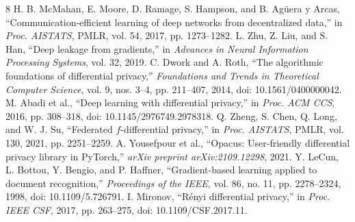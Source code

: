 \documentclass[nolineno]{ieeeaccess}
\begin{document}
\begin{thebibliography}{8}
H. B. McMahan, E. Moore, D. Ramage, S. Hampson, and B. Ag\"uera y Arcas, ``Communication-efficient learning of deep networks from decentralized data,'' in \emph{Proc. AISTATS}, PMLR, vol. 54, 2017, pp. 1273--1282.
L. Zhu, Z. Liu, and S. Han, ``Deep leakage from gradients,'' in \emph{Advances in Neural Information Processing Systems}, vol. 32, 2019.
C. Dwork and A. Roth, ``The algorithmic foundations of differential privacy,'' \emph{Foundations and Trends in Theoretical Computer Science}, vol. 9, nos. 3--4, pp. 211--407, 2014, doi: 10.1561/0400000042.
M. Abadi et al., ``Deep learning with differential privacy,'' in \emph{Proc. ACM CCS}, 2016, pp. 308--318, doi: 10.1145/2976749.2978318.
Q. Zheng, S. Chen, Q. Long, and W. J. Su, ``Federated $f$-differential privacy,'' in \emph{Proc. AISTATS}, PMLR, vol. 130, 2021, pp. 2251--2259.
A. Yousefpour et al., ``Opacus: User-friendly differential privacy library in PyTorch,'' \emph{arXiv preprint arXiv:2109.12298}, 2021.
Y. LeCun, L. Bottou, Y. Bengio, and P. Haffner, ``Gradient-based learning applied to document recognition,'' \emph{Proceedings of the IEEE}, vol. 86, no. 11, pp. 2278--2324, 1998, doi: 10.1109/5.726791.
I. Mironov, ``R\'enyi differential privacy,'' in \emph{Proc. IEEE CSF}, 2017, pp. 263--275, doi: 10.1109/CSF.2017.11.
\end{thebibliography}
\EOD
\end{document}
